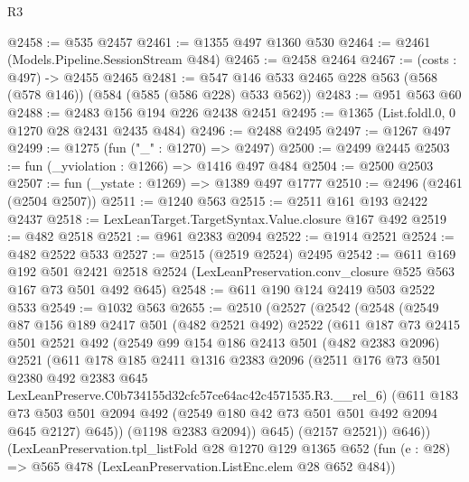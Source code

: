 \begin{lexlean}{R3}
\begin{coremodule}
@2458 := @535 @2457
@2461 := @1355 @497 @1360 @530
@2464 := @2461 (Models.Pipeline.SessionStream @484)
@2465 := @2458 @2464
@2467 := (costs : @497) -> @2455 @2465
@2481 := @547 @146 @533 @2465 @228 @563 (@568 (@578 @146)) (@584 (@585 (@586 @228) @533 @562))
@2483 := @951 @563 @60
@2488 := @2483 @156 @194 @226 @2438 @2451
@2495 := @1365 (List.foldl.{0, 0} @1270 @28 @2431 @2435 @484)
@2496 := @2488 @2495
@2497 := @1267 @497
@2499 := @1275 (fun ("_" : @1270) => @2497)
@2500 := @2499 @2445
@2503 := fun (_yviolation : @1266) => @1416 @497 @484
@2504 := @2500 @2503
@2507 := fun (_ystate : @1269) => @1389 @497 @1777
@2510 := @2496 (@2461 (@2504 @2507))
@2511 := @1240 @563
@2515 := @2511 @161 @193 @2422 @2437
@2518 := LexLeanTarget.TargetSyntax.Value.closure @167 @492
@2519 := @482 @2518
@2521 := @961 @2383 @2094
@2522 := @1914 @2521
@2524 := @482 @2522 @533
@2527 := @2515 (@2519 @2524) @2495
@2542 := @611
    @169
    @192
    @501
    @2421
    @2518
    @2524
    (LexLeanPreservation.conv_closure @525 @563 @167 @73 @501 @492 @645)
@2548 := @611 @190 @124 @2419 @503 @2522 @533
@2549 := @1032 @563
@2655 := @2510
    (@2527
      (@2542
        (@2548
          (@2549
            @87
            @156
            @189
            @2417
            @501
            (@482 @2521 @492)
            @2522
            (@611
              @187
              @73
              @2415
              @501
              @2521
              @492
              (@2549
                @99
                @154
                @186
                @2413
                @501
                (@482 @2383 @2096)
                @2521
                (@611
                  @178
                  @185
                  @2411
                  @1316
                  @2383
                  @2096
                  (@2511
                    @176
                    @73
                    @501
                    @2380
                    @492
                    @2383
                    @645
                    LexLeanPreserve.C0b734155d32cfc57ce64ac42c4571535.R3.__rel_6)
                  (@611
                    @183
                    @73
                    @503
                    @501
                    @2094
                    @492
                    (@2549 @180 @42 @73 @501 @501 @492 @2094 @645 @2127)
                    @645))
                (@1198 @2383 @2094))
              @645)
            (@2157 @2521))
          @646))
      (LexLeanPreservation.tpl_listFold
        @28
        @1270
        @129
        @1365
        @652
        (fun (e : @28) => @565 @478 (LexLeanPreservation.ListEnc.elem @28 @652 @484))

\end{coremodule}
\end{lexlean}
